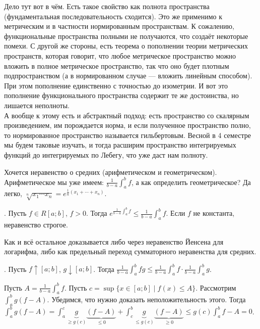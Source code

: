 \documentclass{article}
\begin{document}
\begin{itemize}
\begin{Comment}
            Дело тут вот в чём. Есть такое свойство как полнота пространства (фундаментальная последовательность сходится). Это же применимо к метрическим и в частности нормированным пространствам. К сожалению, функциональные пространства полными не получаются, что создаёт некоторые помехи. С другой же стороны, есть теорема о пополнении теории метрических пространств, которая говорит, что любое метрическое пространство можно вложить в полное метрическое пространство, так что оно будет плотным подпространством (а в нормированном случае --- вложить линейным способом). При этом пополнение единственно с точностью до изометрии. И вот это пополнение функционального пространства содержит те же достоинства, но лишается неполноты.\\
            А вообще к этому есть и абстрактный подход: есть пространство со скалярным произведением, им порождается норма, и если полученное пространство полно, то нормированное пространство называется гильбертовым. Весной в 4 семестре мы будем таковые изучать, и тогда расширим пространство интегрируемых функций до интегрируемых по Лебегу, что уже даст нам полноту.
        \end{Comment}
        \begin{Comment}
            Хочется неравенство о средних (арифметическом и геометрическом). Арифметическое мы уже имеем: $\frac1{b-a}\int_a^bf$, а как определить геометрическое? Да легко, $\sqrt[n]{x_1\cdots x_n}=e^{\frac1n(x_1+\cdots+x_n)}$.
        \end{Comment}
        \thm {}. Пусть $f\in R[a;b]$, $f>0$. Тогда $e^{\frac1{b-a}\int_a^bf}\leqslant\frac1{b-a}\int_a^bf$. Если $f$ не константа, неравенство строгое.
        \begin{Proof}
            Как и всё остальное доказывается либо через неравенство Йенсена для логарифма, либо как предельный переход сумматорного неравенства для средних.
        \end{Proof}
        \thm {}. Пусть $f\uparrow[a;b]$, $g\downarrow[a;b]$. Тогда $\frac1{b-a}\int_a^bfg\leqslant\frac1{b-a}\int_a^bf\cdot\frac1{b-a}\int_a^bg$.
        \begin{Proof}
            Пусть $A=\frac1{b-a}\int_a^bf$. Пусть $c=\sup\{x\in[a;b]\mid f(x)\leqslant A\}$. Рассмотрим $\int_a^bg(f-A)$. Убедимся, что нужно доказать неположительность этого. Тогда $\int_a^bg(f-A)=\int_a^c\underbrace{g}_{\geqslant g(c)}\underbrace{(f-A)}_{\leqslant0}+\int_c^b\underbrace{g}_{\leqslant g(c)}\underbrace{(f-A)}_{\geqslant0}\leqslant g(c)\int_a^bf-A=0$.

\end{Proof}
\end{itemize}
\end{document}
